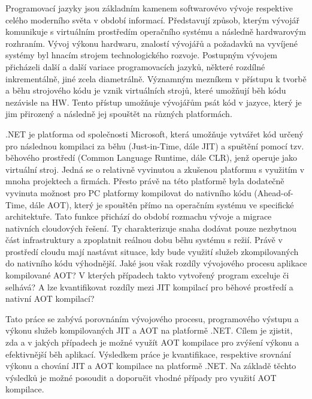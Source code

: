 Programovací jazyky jsou základním kamenem softwarovévo vývoje respektive celého moderního světa v období informací. Představují způsob, kterým vývojář komunikuje s virtuálním prostředím operačního systému a následně hardwarovým rozhraním. Vývoj výkonu hardwaru, znalostí vývojářů a požadavků na vyvíjené systémy byl hnacím strojem technologického rozvoje. Postupným vývojem přicházeli další a další variace programovacích jazyků, některé rozdílné inkrementálně, jiné zcela diametrálně. Významným mezníkem v přístupu k tvorbě a běhu strojového kódu je vznik virtuálních strojů, které umožňují běh kódu nezávisle na HW. Tento přístup umožňuje vývojářům psát kód v jazyce, který je jim přirozený a následně jej spouštět na různých platformách.

.NET je platforma od společnosti Microsoft, která umožňuje vytvářet kód určený pro následnou kompilaci za běhu (Just-in-Time, dále JIT) a spuštění pomocí tzv. běhového prostředí (Common Language Runtime, dále CLR), jenž operuje jako virtuální stroj. Jedná se o relativně vyvinutou a zkušenou platformu s využitím v mnoha projektech a firmách. Přesto právě na této platformě byla dodatečně vyvinuta možnost pro PC platformy kompilovat do nativního kódu (Ahead-of-Time, dále AOT), který je spouštěn přímo na operačním systému ve specifické architektuře. Tato funkce přichází do období rozmachu vývoje a migrace nativních cloudových řešení. Ty charakterizuje snaha dodávat pouze nezbytnou část infrastruktury a zpoplatnit reálnou dobu běhu systému s režií. Právě v prostředí cloudu mají nastávat situace, kdy bude využití služeb zkompilovaných do nativního kódu výhodnější. Jaké jsou však rozdíly vývojového procesu aplikace kompilované AOT? V kterých případech takto vytvořený program exceluje či selhává? A lze kvantifikovat rozdíly mezi JIT kompilací pro běhové prostředí a nativní AOT kompilací?

Tato práce se zabývá porovnáním vývojového procesu, programového výstupu a výkonu služeb kompilovaných JIT a AOT na platformě .NET. Cílem je zjistit, zda a v jakých případech je možné využít AOT kompilace pro zvýšení výkonu a efektivnější běh aplikací. Výsledkem práce je kvantifikace, respektive srovnání výkonu a chování JIT a AOT kompilace na platformě .NET. Na základě těchto výsledků je možné posoudit a doporučit vhodné případy pro využití AOT kompilace.